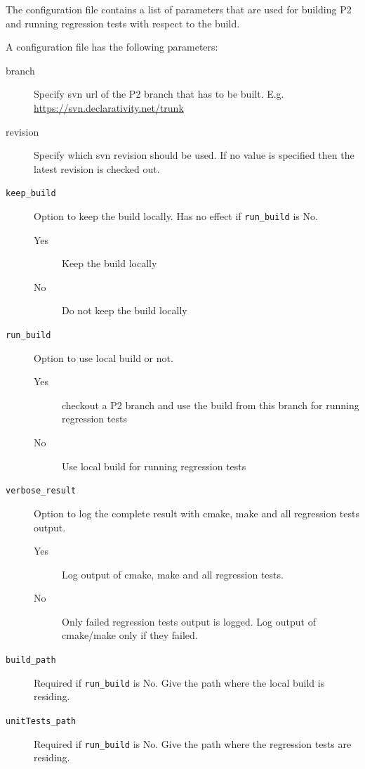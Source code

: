 \documentclass{article}
\begin{document}
The configuration file contains a list of parameters that are used for
building P2 and running regression tests with respect to the build.

A configuration file has the following parameters:

\begin{description}
\item[branch] Specify svn url of the P2 branch that has to be
             built. E.g. \url{https://svn.declarativity.net/trunk}

\item[revision] Specify which svn revision should be used. If no value
             is specified then the latest revision is checked out.

\item[\texttt{keep\_build}] Option to keep the build locally. Has no effect if
             \texttt{run\_build} is No.
\begin{description}
\item[Yes] Keep the build locally
\item[No] Do not keep the build locally
\end{description}

\item[\texttt{run\_build}] Option to use local build or not.
\begin{description}
\item[Yes] checkout a P2 branch and use the build from this branch for
                          running regression tests
\item[No] Use local build for running regression tests
\end{description}

\item[\texttt{verbose\_result}] Option to log the complete result with cmake, make
               and all regression tests output.
\begin{description}
\item[Yes] Log output of cmake, make and all regression tests.
\item[No] Only failed regression tests output is logged. Log output of
               cmake/make only if they failed.
\end{description}


\item[\texttt{build\_path}] Required if \texttt{run\_build} is No. Give the path where the
               local build is residing.

\item[\texttt{unitTests\_path}] Required if \texttt{run\_build} is No. Give the path where
               the regression tests are residing.


\end{description}
\end{document}
